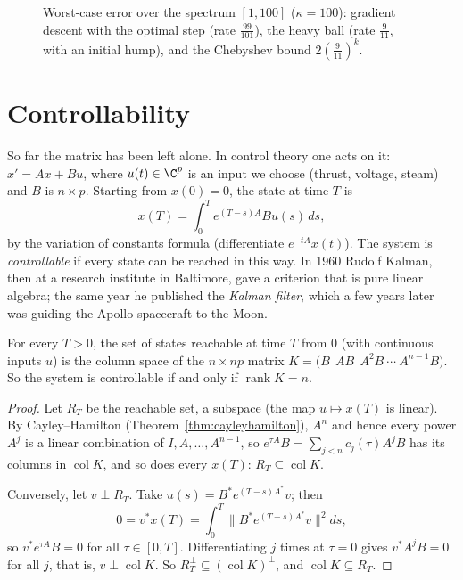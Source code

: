 \begin{figure}[ht]
\centering
{}
\caption{Worst-case error over the spectrum $[1,100]$ ($\kappa=100$): gradient descent with the optimal step (rate $\frac{99}{101}$), the
heavy ball (rate $\frac9{11}$, with an initial hump), and the Chebyshev bound $2(\frac9{11})^k$.}
\label{fig:rates}
\end{figure}

\section{Controllability}

So far the matrix has been left alone. In control theory one acts on it: $x'=Ax+Bu$, where $u(t)\in\C^p$ is an input we choose (thrust,
voltage, steam) and $B$ is $n\times p$. Starting from $x(0)=0$, the state at time $T$ is
\[
x(T)=\int_0^Te^{(T-s)A}Bu(s)\,ds,
\]
by the variation of constants formula (differentiate $e^{-tA}x(t)$). The system is \emph{controllable} if every state can be reached
in this way. In 1960 Rudolf Kalman, then at a research institute in Baltimore, gave a criterion that is pure linear algebra; the same
year he published the \emph{Kalman filter}, which a few years later was guiding the Apollo spacecraft to the Moon.

\begin{theorem}\label{thm:kalman}
For every $T>0$, the set of states reachable at time $T$ from $0$ (with continuous inputs $u$) is the column space of the
$n\times np$ matrix $K=\bigl(B\ \ AB\ \ A^2B\ \cdots\ A^{n-1}B\bigr)$. So the system is controllable if and only if $\operatorname{rank}K=n$.
\end{theorem}
\begin{proof}
Let $R_T$ be the reachable set, a subspace (the map $u\mapsto x(T)$ is linear). By Cayley--Hamilton (Theorem~\ref{thm:cayleyhamilton}),
$A^n$ and hence every power $A^j$ is a linear combination of $I,A,\dots,A^{n-1}$, so $e^{\tau A}B=\sum_{j<n}c_j(\tau)A^jB$ has its columns in
$\operatorname{col}K$, and so does every $x(T)$: $R_T\subseteq\operatorname{col}K$.

Conversely, let $v\perp R_T$. Take $u(s)=B^*e^{(T-s)A^*}v$; then
\[
0=v^*x(T)=\int_0^T\bigl\|B^*e^{(T-s)A^*}v\bigr\|^2ds,
\]
so $v^*e^{\tau A}B=0$ for all $\tau\in[0,T]$. Differentiating $j$ times at $\tau=0$ gives $v^*A^jB=0$ for all $j$, that is, $v\perp\operatorname{col}K$. So
$R_T^\perp\subseteq(\operatorname{col}K)^\perp$, and $\operatorname{col}K\subseteq R_T$.
\end{proof}

